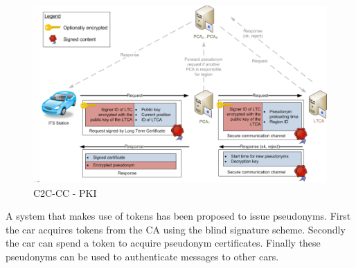 \documentclass{article}
\begin{document}
\begin{figure}[!h]
\centering
\includegraphics[width=\textwidth, height=\textheight, keepaspectratio]{images/c2cccpki.png}
\caption{C2C-CC - PKI}
\label{fig:c2cccpki}
\end{figure}

A system that makes use of tokens has been proposed to issue pseudonyms. First the car acquires tokens from the CA using the blind signature scheme. Secondly the car can spend a token to acquire pseudonym certificates. Finally these pseudonyms can be used to authenticate messages to other cars.



\end{document}
